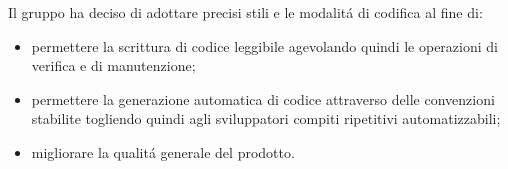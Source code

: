 Il gruppo \Gruppo{} ha deciso di adottare precisi stili e le modalit\'{a} di codifica al fine di:

\begin{itemize}
    \item permettere la scrittura di codice leggibile agevolando quindi le operazioni di verifica e di manutenzione;
    \item permettere la generazione automatica di codice attraverso delle convenzioni stabilite togliendo quindi agli sviluppatori compiti ripetitivi automatizzabili; 
    \item migliorare la qualit\'{a} generale del prodotto.
\end{itemize}